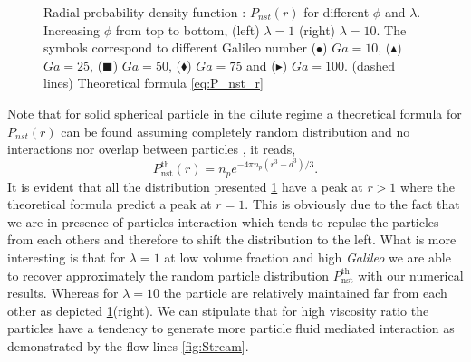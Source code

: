 \begin{figure}
    \caption{Radial probability density function : $P_{nst}(r)$ for different $\phi$ and $\lambda$. 
    Increasing $\phi$ from top to bottom, (left) $\lambda = 1$ (right) $\lambda = 10$. 
    The symbols correspond to different Galileo number ($\bullet$) $Ga = 10$, ($\blacktriangle$) $Ga = 25$, ($\blacksquare$) $Ga = 50$, ($\blacklozenge$) $Ga = 75$ and ($\blacktriangleright$) $Ga = 100$.
    (dashed lines) Theoretical formula \ref{eq:P_nst_r}}
    \label{fig:P_nst_r}
\end{figure}
Note that for solid spherical particle in the dilute regime a theoretical formula for $P_{nst}(r)$ can be found assuming completely random distribution and no interactions nor overlap between particles \citep{zhang2021ensemble}, it reads, 
\begin{equation*}
    P_\text{nst}^\text{th}(r) = n_p e^{-4 \pi n_p (r^3 - d^3)/3}.
    \label{eq:P_nst_r}
\end{equation*}
It is evident that all the distribution presented \ref{fig:P_nst_r} have a peak at $r > 1$ where the theoretical formula  predict a peak at $r=1$. 
This is obviously due to the fact that we are in presence of particles interaction which tends to repulse the particles from each others and therefore to shift the distribution to the left. 
What is more interesting is that for $\lambda = 1$ at low volume fraction and high \textit{Galileo} we are able to recover approximately the random particle distribution $P_\text{nst}^\text{th}$ with our numerical results. 
Whereas for $\lambda = 10$ the particle are relatively maintained far from  each other as depicted \ref{fig:P_nst_r}(right). 
We can stipulate that for high viscosity ratio the particles have a tendency to generate more particle fluid mediated interaction as demonstrated by the flow lines \ref{fig:Stream}.


